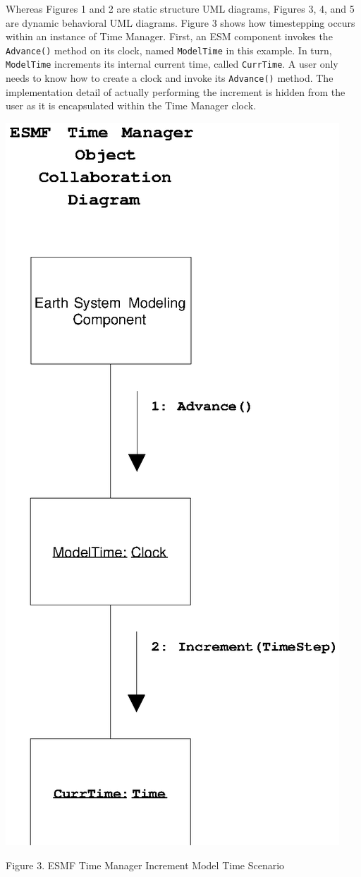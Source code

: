 

Whereas Figures 1 and 2 are static structure UML diagrams, Figures 3, 4,  and
5 are dynamic behavioral UML diagrams.  Figure 3 shows how timestepping occurs
within an instance of Time Manager.  First, an ESM component invokes the
{\tt Advance()} method on its clock, named {\tt ModelTime} in this example.
In turn, {\tt ModelTime} increments its internal current time, called
{\tt CurrTime}.  A user only needs to know how to create a clock and invoke
its {\tt Advance()} method.  The implementation detail of actually performing
the increment is hidden from the user as it is encapsulated within the Time
Manager clock.

\begin{center}
\includegraphics{TimeMgrOCD1.EPS}
   
Figure 3.  ESMF Time Manager Increment Model Time Scenario
   
\end{center}
